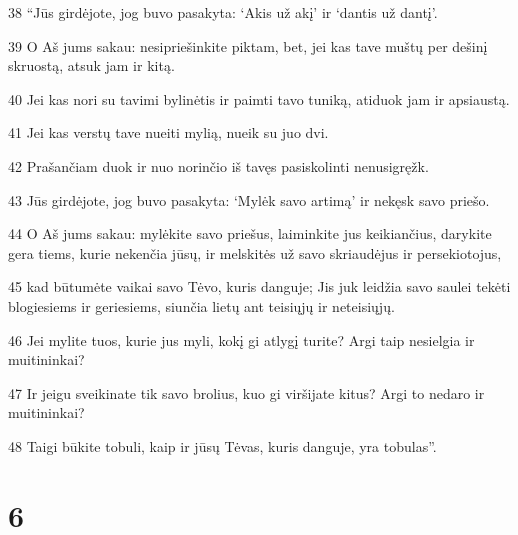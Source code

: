 \par 38 “Jūs girdėjote, jog buvo pasakyta: ‘Akis už akį’ ir ‘dantis už dantį’. 
\par 39 O Aš jums sakau: nesipriešinkite piktam, bet, jei kas tave muštų per dešinį skruostą, atsuk jam ir kitą. 
\par 40 Jei kas nori su tavimi bylinėtis ir paimti tavo tuniką, atiduok jam ir apsiaustą. 
\par 41 Jei kas verstų tave nueiti mylią, nueik su juo dvi. 
\par 42 Prašančiam duok ir nuo norinčio iš tavęs pasiskolinti nenusigręžk. 
\par 43 Jūs girdėjote, jog buvo pasakyta: ‘Mylėk savo artimą’ ir nekęsk savo priešo. 
\par 44 O Aš jums sakau: mylėkite savo priešus, laiminkite jus keikiančius, darykite gera tiems, kurie nekenčia jūsų, ir melskitės už savo skriaudėjus ir persekiotojus, 
\par 45 kad būtumėte vaikai savo Tėvo, kuris danguje; Jis juk leidžia savo saulei tekėti blogiesiems ir geriesiems, siunčia lietų ant teisiųjų ir neteisiųjų. 
\par 46 Jei mylite tuos, kurie jus myli, kokį gi atlygį turite? Argi taip nesielgia ir muitininkai? 
\par 47 Ir jeigu sveikinate tik savo brolius, kuo gi viršijate kitus? Argi to nedaro ir muitininkai? 
\par 48 Taigi būkite tobuli, kaip ir jūsų Tėvas, kuris danguje, yra tobulas”.



\chapter{6}


